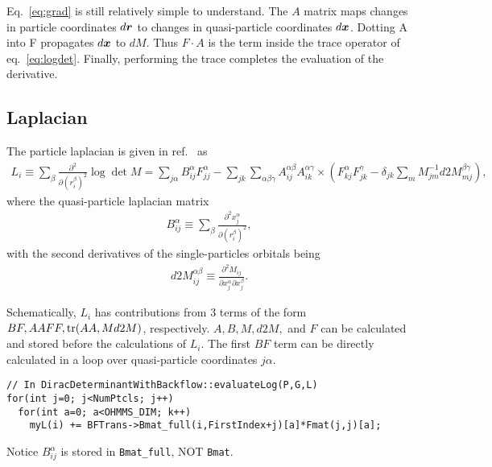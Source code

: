 Eq.~\ref{eq:grad} is still relatively simple to understand. The $A$ matrix maps changes in particle coordinates $d\boldsymbol{r}$ to changes in quasi-particle coordinates $d\boldsymbol{x}$. Dotting A into F propagates $d\boldsymbol{x}$ to $dM$. Thus $F\cdot A$ is the term inside the trace operator of eq.~\ref{eq:logdet}. Finally, performing the trace completes the evaluation of the derivative.

\subsection{Laplacian}
The particle laplacian is given in ref.~\cite{Kwon1993backflow} as
\begin{align}
L_i \equiv \sum\limits_{\beta} \frac{\partial^2}{\partial (r_i^\beta)^2} \log\det M = \sum\limits_{j\alpha} B_{ij}^\alpha F_{jj}^\alpha - \sum\limits_{jk}\sum\limits_{\alpha\beta\gamma} A_{ij}^{\alpha\beta}A_{ik}^{\alpha\gamma}\times\left(F_{kj}^\alpha F_{jk}^\gamma -\delta_{jk}\sum\limits_m M^{-1}_{jm} d2M_{mj}^{\beta\gamma}\right), \label{eq:lap}
\end{align}
where the quasi-particle laplacian matrix
\begin{align}
B_{ij}^{\alpha} \equiv \sum\limits_\beta \frac{\partial^2 x_j^\alpha}{\partial (r_i^\beta)^2},
\end{align}
with the second derivatives of the single-particles orbitals being
\begin{align}
d2M_{ij}^{\alpha\beta} \equiv \frac{\partial^2 M_{ij}}{\partial x_j^\alpha\partial x_j^\beta}.
\end{align}

Schematically, $L_i$ has contributions from 3 terms of the form $BF, AAFF, \text{tr}(AA,Md2M)$, respectively. $A, B, M ,d2M,$ and $F$ can be calculated and stored before the calculations of $L_i$. The first $BF$ term can be directly calculated in a loop over quasi-particle coordinates $j\alpha$.
\begin{lstlisting}
// In DiracDeterminantWithBackflow::evaluateLog(P,G,L)
for(int j=0; j<NumPtcls; j++)
  for(int a=0; a<OHMMS_DIM; k++)
    myL(i) += BFTrans->Bmat_full(i,FirstIndex+j)[a]*Fmat(j,j)[a];
\end{lstlisting}
Notice $B_{ij}^\alpha$ is stored in \verb|Bmat_full|, NOT \verb|Bmat|. 


